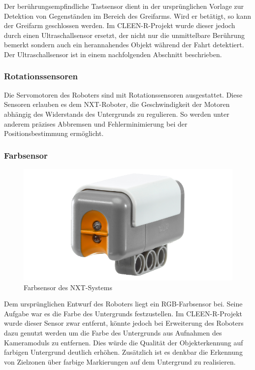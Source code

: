 Der berührungsempfindliche Tastsensor dient in der ursprünglichen Vorlage zur Detektion von Gegenständen im Bereich des Greifarms. Wird er betätigt, so kann der Greifarm geschlossen werden. Im CLEEN-R-Projekt wurde dieser jedoch durch einen Ultraschallsensor ersetzt, der nicht nur die unmittelbare Berührung bemerkt sondern auch ein herannahendes Objekt während der Fahrt detektiert. Der Ultraschallsensor ist in einem nachfolgenden Abschnitt beschrieben.

\subsubsection{Rotationssensoren}

Die Servomotoren des Roboters sind mit Rotationssensoren ausgestattet. Diese Sensoren erlauben es dem NXT-Roboter, die Geschwindigkeit der Motoren abhängig des Widerstands des Untergrunds zu regulieren. So werden unter anderem präzises Abbremsen und Fehlerminimierung bei der Positionsbestimmung ermöglicht.

\subsubsection{Farbsensor}

\begin{figure}[h]
\centering
\includegraphics[width=\textwidth/3]{Bilder/Robot/color_sensor}
\caption{Farbsensor des NXT-Systems}
\label{fig:colorSensor}
\end{figure}

Dem ursprünglichen Entwurf des Roboters liegt ein RGB-Farbsensor bei. Seine Aufgabe war es die Farbe des Untergrunds festzustellen. Im CLEEN-R-Projekt wurde dieser Sensor zwar entfernt, könnte jedoch bei Erweiterung des Roboters dazu genutzt werden um die Farbe des Untergrunds aus Aufnahmen des Kameramoduls zu entfernen. Dies würde die Qualität der Objekterkennung auf farbigen Untergrund deutlich erhöhen. Zusätzlich ist es denkbar die Erkennung von Zielzonen über farbige Markierungen auf dem Untergrund zu realisieren.

